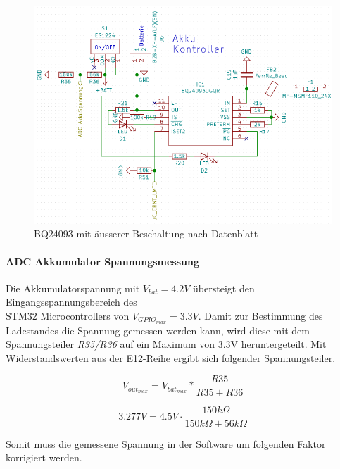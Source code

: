 \begin{figure} [H]
\begin{center}
\includegraphics[scale=0.5]{../graphics/Schema_Akku.png}
\caption{BQ24093 mit äusserer Beschaltung nach Datenblatt}
\label{fig:Schema_Akku}
\end{center}
\end{figure}

\paragraph{ADC Akkumulator Spannungsmessung}

Die Akkumulatorspannung mit ${V_{bat}=4.2\si{V}}$ übersteigt den Eingangsspannungsbereich des\\
 STM32 Microcontrollers von ${V_{GPIO_{max}}=3.3\si{V}}$.
Damit zur Bestimmung des Ladestandes die Spannung gemessen werden kann, wird diese mit dem Spannungsteiler \textit{R35/R36} auf ein Maximum von 3.3\si{V} heruntergeteilt. 
Mit Widerstandswerten aus der E12-Reihe ergibt sich folgender Spannungsteiler.

\begin{equation}
V_{out_{max}} = V_{bat_{max}}*\frac{R35}{R35+R36}
\end{equation}

\begin{equation}
3.277\si{V} = 4.5\si{V}\cdot \frac{150\si{k\Omega}}{150\si{k\Omega}+56\si{k\Omega}}
\end{equation}

Somit muss die gemessene Spannung in der Software um folgenden Faktor korrigiert werden.


